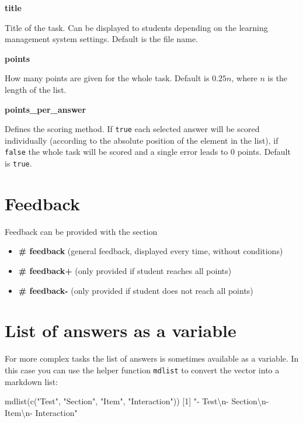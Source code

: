 \documentclass[twoside]{tufte-book}
\newenvironment{Shaded}{}{}
\newcommand{\DecValTok}[1]{\textcolor[rgb]{0.25,0.63,0.44}{#1}}
\newcommand{\FunctionTok}[1]{\textcolor[rgb]{0.02,0.16,0.49}{#1}}
\newcommand{\NormalTok}[1]{#1}
\newcommand{\SpecialCharTok}[1]{\textcolor[rgb]{0.25,0.44,0.63}{#1}}
\newcommand{\StringTok}[1]{\textcolor[rgb]{0.25,0.44,0.63}{#1}}
\providecommand{\tightlist}{%
  \setlength{\itemsep}{0pt}\setlength{\parskip}{0pt}}
\begin{document}
\noindent\textbf{title}\label{title-5}

Title of the task. Can be displayed to students depending on the learning management system settings. Default is the file name.

\noindent\textbf{points}\label{points-6}

How many points are given for the whole task. Default is \(0.25n\), where \(n\) is the length of the list.

\noindent\textbf{points\_per\_answer}\label{points_per_answer}

Defines the scoring method. If \texttt{true} each selected answer will be scored individually (according to the absolute position of the element in the list), if \texttt{false} the whole task will be scored and a single error leads to 0 points. Default is \texttt{true}.

\section{Feedback}\label{feedback-5}

Feedback can be provided with the section

\begin{itemize}
\tightlist
\item
  \textbf{\# feedback} (general feedback, displayed every time, without conditions)
\item
  \textbf{\# feedback+} (only provided if student reaches all points)
\item
  \textbf{\# feedback-} (only provided if student does not reach all points)
\end{itemize}

\section{List of answers as a variable}\label{list-of-answers-as-a-variable-2}

For more complex tasks the list of answers is sometimes available as a variable. In this case you can use the helper function \texttt{mdlist} to convert the vector into a markdown list:

\begin{Shaded}
\begin{Highlighting}[]
\FunctionTok{mdlist}\NormalTok{(}\FunctionTok{c}\NormalTok{(}\StringTok{"Test"}\NormalTok{, }\StringTok{"Section"}\NormalTok{, }\StringTok{"Item"}\NormalTok{, }\StringTok{"Interaction"}\NormalTok{))}
\NormalTok{[}\DecValTok{1}\NormalTok{] }\StringTok{"{-} Test}\SpecialCharTok{\textbackslash{}n}\StringTok{{-} Section}\SpecialCharTok{\textbackslash{}n}\StringTok{{-} Item}\SpecialCharTok{\textbackslash{}n}\StringTok{{-} Interaction"}
\end{Highlighting}
\end{Shaded}
\end{document}
